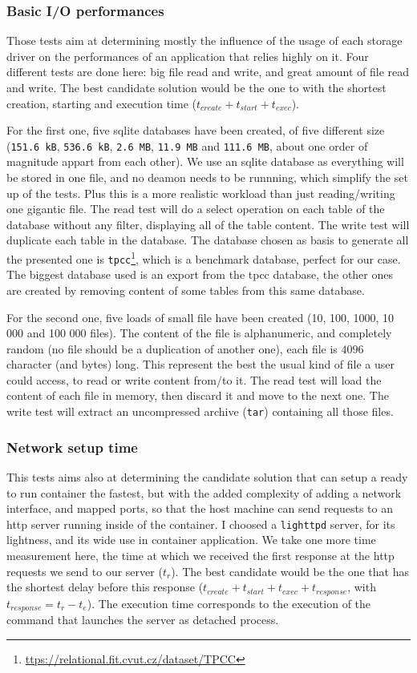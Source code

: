 \subsubsection{Basic I/O performances}
Those tests aim at determining mostly the influence of the usage of each storage driver on the performances of an application that relies highly on it.  Four different tests are done here: big file read and write, and great amount of file read and write.  The best candidate solution would be the one to with the shortest creation, starting and execution time ($t_{create} + t_{start} + t_{exec}$).

For the first one, five sqlite databases have been created, of five different size (\texttt{151.6 kB}, \texttt{536.6 kB}, \texttt{2.6 MB}, \texttt{11.9 MB} and \texttt{111.6 MB}, about one order of magnitude appart from each other).  We use an sqlite database as everything will be stored in one file, and no deamon needs to be runnning, which simplify the set up of the tests.  Plus this is a more realistic workload than just reading/writing one gigantic file.
The read test will do a select operation on each table of the database without any filter, displaying all of the table content.  The write test will duplicate each table in the database.  The database chosen as basis to generate all the presented one is \texttt{tpcc}\footnote{\href{https://relational.fit.cvut.cz/dataset/TPCC}{ttps://relational.fit.cvut.cz/dataset/TPCC}}, which is a benchmark database, perfect for our case.  The biggest database used is an export from the tpcc database, the other ones are created by removing content of some tables from this same database.

For the second one, five loads of small file have been created (10, 100, 1000, 10 000 and 100 000 files).  The content of the file is alphanumeric, and completely random (no file should be a duplication of another one), each file is $4096$ character (and bytes) long.  This represent the best the usual kind of file a user could access, to read or write content from/to it. 
The read test will load the content of each file in memory, then discard it and move to the next one.  The write test will extract an uncompressed archive (\texttt{tar}) containing all those files.

\subsubsection{Network setup time}
This tests aims also at determining the candidate solution that can setup a ready to run container the fastest, but with the added complexity of adding a network interface, and mapped ports, so that the host machine can send requests to an http server running inside of the container.  I choosed a \texttt{lighttpd} server, for its lightness, and its wide use in container application.  We take one more time measurement here, the time at which we received the first response at the http requests we send to our server ($t_r$).  The best candidate would be the one that has the shortest delay before this response ($t_{create} + t_{start} + t_{exec} + t_{response}$, with $t_{response}=t_r - t_e$).  The execution time corresponds to the execution of the command that launches the server as detached process.

